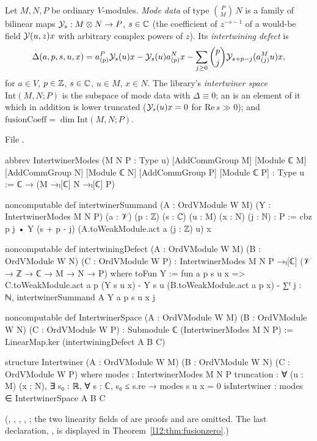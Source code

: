 \begin{definition}\label{l12:def:intertwiner}
Let $M,N,P$ be ordinary $V$-modules. \emph{Mode data} of type $\binom PM\,N$ is a family of bilinear maps
$\mathcal{Y}_s:M\otimes N\to P$, $s\in{\mathbb{C}}$ (the coefficient of $z^{-s-1}$ of a would-be field $\mathcal{Y}(u,z)x$ with arbitrary
complex powers of $z$). Its \emph{intertwining defect} is
\begin{equation*}
 \Delta(a,p,s,u,x) = a^P_{(p)}\mathcal{Y}_s(u)x - \mathcal{Y}_s(u)a^N_{(p)}x - \sum_{j\ge0}\binom pj\mathcal{Y}_{s+p-j}(a^M_{(j)}u)x ,
\end{equation*}
for $a\in V$, $p\in{\mathbb{Z}}$, $s\in{\mathbb{C}}$, $u\in M$, $x\in N$. The library's \emph{intertwiner space} $\mathrm{Int}(M,N;P)$ is the subspace of mode data
with $\Delta\equiv0$; an  is an element of it which in addition is lower truncated ($\mathcal{Y}_s(u)x = 0$ for
$\mathrm{Re}\,s\gg0$); and $\mathrm{fusionCoeff} = \dim\mathrm{Int}(M,N;P)$.
\end{definition}
\noindent File .
\begin{leancode}
abbrev IntertwinerModes (M N P : Type u) [AddCommGroup M] [Module ℂ M] [AddCommGroup N]
    [Module ℂ N] [AddCommGroup P] [Module ℂ P] : Type u := ℂ → (M →ₗ[ℂ] N →ₗ[ℂ] P)

noncomputable def intertwinerSummand (A : OrdVModule W M) (Y : IntertwinerModes M N P)
    (a : 𝒱) (p : ℤ) (s : ℂ) (u : M) (x : N) (j : ℕ) : P :=
  cbz p j • Y (s + p - j) (A.toWeakModule.act a (j : ℤ) u) x

noncomputable def intertwiningDefect (A : OrdVModule W M) (B : OrdVModule W N) (C : OrdVModule W P) :
    IntertwinerModes M N P →ₗ[ℂ] (𝒱 → ℤ → ℂ → M → N → P) where
  toFun Y := fun a p s u x =>
    C.toWeakModule.act a p (Y s u x) - Y s u (B.toWeakModule.act a p x)
      - ∑ᶠ j : ℕ, intertwinerSummand A Y a p s u x j

noncomputable def IntertwinerSpace (A : OrdVModule W M) (B : OrdVModule W N) (C : OrdVModule W P) :
    Submodule ℂ (IntertwinerModes M N P) :=
  LinearMap.ker (intertwiningDefect A B C)

structure Intertwiner (A : OrdVModule W M) (B : OrdVModule W N) (C : OrdVModule W P) where
  modes : IntertwinerModes M N P
  truncation : ∀ (u : M) (x : N), ∃ s₀ : ℝ, ∀ s : ℂ, s₀ ≤ s.re → modes s u x = 0
  isIntertwiner : modes ∈ IntertwinerSpace A B C
\end{leancode}
(, , , ,
; the two linearity fields of  are proofs and are omitted. The last
declaration, , is displayed in Theorem~\ref{l12:thm:fusionzero}.)

